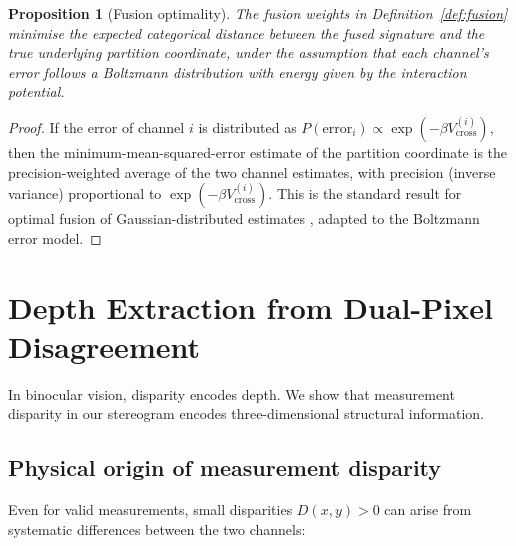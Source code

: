 \documentclass[11pt,twocolumn,a4paper]{article}
\newtheorem{proposition}[theorem]{Proposition}
\begin{document}
\begin{proposition}[Fusion optimality]\label{prop:fusion_optimal}
The fusion weights in Definition~\ref{def:fusion} minimise the expected categorical distance between the fused signature and the true underlying partition coordinate, under the assumption that each channel's error follows a Boltzmann distribution with energy given by the interaction potential.
\end{proposition}
\begin{proof}
If the error of channel $i$ is distributed as $P(\text{error}_i) \propto \exp(-\beta V_{\mathrm{cross}}^{(i)})$, then the minimum-mean-squared-error estimate of the partition coordinate is the precision-weighted average of the two channel estimates, with precision (inverse variance) proportional to $\exp(-\beta V_{\mathrm{cross}}^{(i)})$.
This is the standard result for optimal fusion of Gaussian-distributed estimates \citep{BarShalom1995}, adapted to the Boltzmann error model.
\end{proof}



\section{Depth Extraction from Dual-Pixel Disagreement}\label{sec:depth}

In binocular vision, disparity encodes depth.
We show that measurement disparity in our stereogram encodes three-dimensional structural information.

\subsection{Physical origin of measurement disparity}

Even for valid measurements, small disparities $D(x,y) > 0$ can arise from systematic differences between the two channels:
\end{document}
